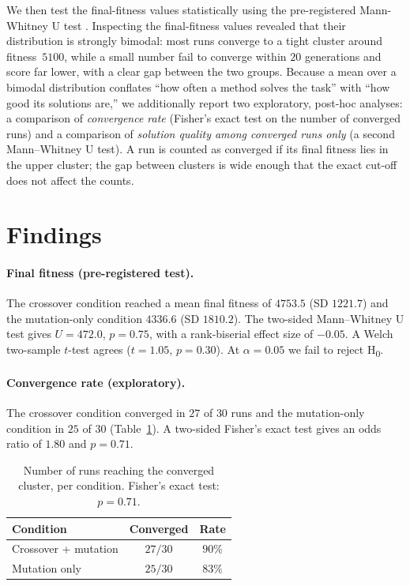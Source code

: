\documentclass[a4paper, twocolumn]{article}
\begin{document}
We then test the final-fitness values statistically using the pre-registered Mann-Whitney U
test \cite{mann1947test}. Inspecting the final-fitness values revealed that their distribution
is strongly bimodal: most runs converge to a tight cluster around fitness~$5100$, while a small
number fail to converge within $20$ generations and score far lower, with a clear gap between
the two groups. Because a mean over a bimodal distribution conflates ``how often a method
solves the task'' with ``how good its solutions are,'' we additionally report two exploratory,
post-hoc analyses: a comparison of \emph{convergence rate} (Fisher's exact test on the number of
converged runs) and a comparison of \emph{solution quality among converged runs only} (a second
Mann--Whitney U test). A run is counted as converged if its final fitness lies in the upper
cluster; the gap between clusters is wide enough that the exact cut-off does not affect the
counts.

\section{Findings\label{sec:Findings}}

\paragraph{Final fitness (pre-registered test).}
The crossover condition reached a mean final fitness of $4753.5$ (SD $1221.7$) and the
mutation-only condition $4336.6$ (SD $1810.2$). The two-sided Mann--Whitney U test gives
$U = 472.0$, $p = 0.75$, with a rank-biserial effect size of $-0.05$. A Welch two-sample
$t$-test agrees ($t = 1.05$, $p = 0.30$). At $\alpha = 0.05$ we fail to reject
H\textsubscript{0}.

\paragraph{Convergence rate (exploratory).}
The crossover condition converged in $27$ of $30$ runs and the mutation-only condition in $25$
of $30$ (Table~\ref{tab:convergence}). A two-sided Fisher's exact test gives an odds ratio of
$1.80$ and $p = 0.71$.

\begin{table}[ht]
    \centering
    \small
    \begin{tabular}{lcc}
        \hline
        Condition & Converged & Rate \\
        \hline
        Crossover + mutation & $27/30$ & $90\%$ \\
        Mutation only        & $25/30$ & $83\%$ \\
        \hline
    \end{tabular}
    \caption{Number of runs reaching the converged cluster, per condition.
    Fisher's exact test: $p = 0.71$.}
    \label{tab:convergence}
\end{table}
\end{document}

